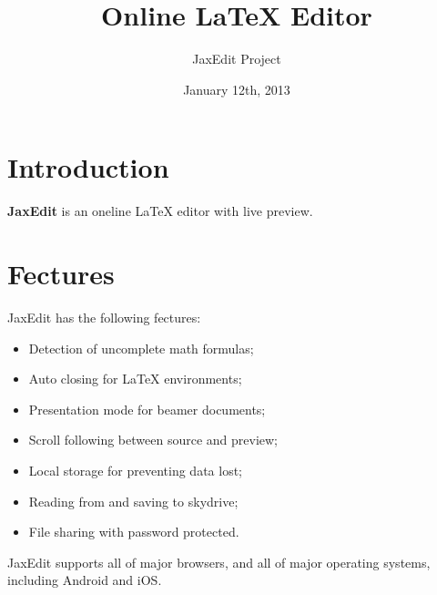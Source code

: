 \documentclass{article}
\begin{document}
\title{Online LaTeX Editor}
\author{JaxEdit Project}
\date{January 12th, 2013}
\maketitle

\tableofcontents

\section{Introduction}

\textbf{JaxEdit} is an oneline LaTeX editor with live preview.

\section{Fectures}

JaxEdit has the following fectures:

\begin{itemize}
\item Detection of uncomplete math formulas;
\item Auto closing for LaTeX environments;
\item Presentation mode for beamer documents;
\item Scroll following between source and preview;
\item Local storage for preventing data lost;
\item Reading from and saving to skydrive;
\item File sharing with password protected.
\end{itemize}

JaxEdit supports all of major browsers, and all of major operating systems, including Android and iOS.
\end{document}
